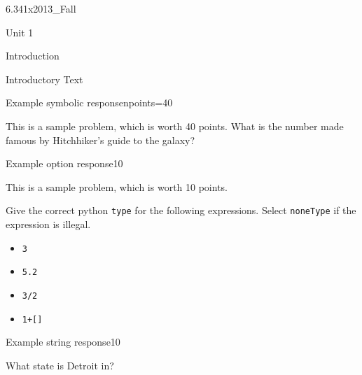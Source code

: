\documentclass[12pt]{article}
\begin{document}
\begin{edXcourse}{6.341x}{2013_Fall}
\begin{edXchapter}{Unit 1}
\begin{edXsection}{Introduction}
\begin{edXtext}{Introductory Text}
\end{edXtext}

%
%
%
\begin{edXproblem}{Example symbolic response}{npoints=40}

This is a sample problem, which is worth 40 points.  What is the number made famous by
Hitchhiker's guide to the galaxy?


\end{edXproblem}


\begin{edXproblem}{Example option response}{10}

This is a sample problem, which is worth 10 points.

Give the correct python {\tt type} for the following expressions.  Select {\tt noneType} if the expression is illegal.

\begin{itemize}
\item {\tt 3}   
\item {\tt 5.2} 
\item {\tt 3/2} 
\item {\tt 1+[]} 
\end{itemize}

\end{edXproblem}


\begin{edXproblem}{Example string response}{10}

What state is Detroit in?


\end{edXproblem}


\end{edXsection}
\end{edXchapter}
\end{edXcourse}
\end{document}
